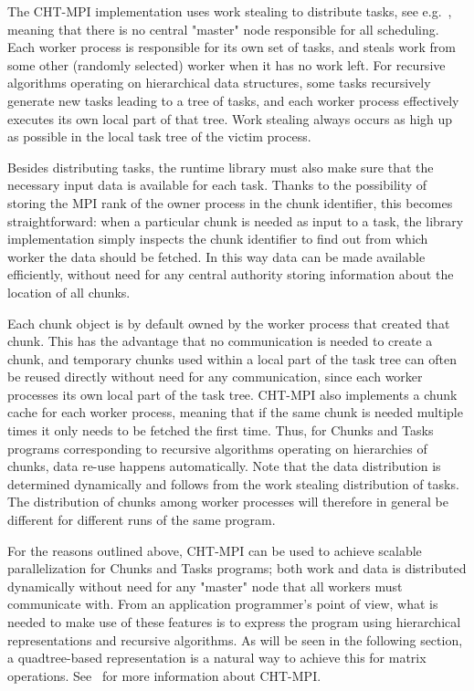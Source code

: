 \documentclass{elsarticle}
\begin{document}
The CHT-MPI implementation uses work stealing to distribute tasks, see
e.g.~\cite{BlumofeAndLeiserson1999}, meaning that there is no central
"master" node responsible for all scheduling. Each worker process is
responsible for its own set of tasks, and steals work from some other
(randomly selected) worker when it has no work left. For recursive
algorithms operating on hierarchical data structures, some tasks
recursively generate new tasks leading to a tree of tasks, and each
worker process effectively executes its own local part of that tree.
Work stealing always occurs as high up as possible in the local task
tree of the victim process.

Besides distributing tasks, the runtime library must also make sure
that the necessary input data is available for each task. Thanks to
the possibility of storing the MPI rank of the owner process in the
chunk identifier, this becomes straightforward: when a particular
chunk is needed as input to a task, the library implementation simply
inspects the chunk identifier to find out from which worker the data
should be fetched. In this way data can be made available efficiently,
without need for any central authority storing information about the
location of all chunks.

Each chunk object is by default owned by the worker process that
created that chunk. This has the advantage that no communication is
needed to create a chunk, and temporary chunks used within a local
part of the task tree can often be reused directly without need for
any communication, since each worker processes its own local part of
the task tree. CHT-MPI also implements a chunk cache for each worker
process, meaning that if the same chunk is needed multiple times it
only needs to be fetched the first time. Thus, for Chunks and Tasks
programs corresponding to recursive algorithms operating on
hierarchies of chunks, data re-use happens automatically. Note that
the data distribution is determined dynamically and follows from the
work stealing distribution of tasks. The distribution of chunks among
worker processes will therefore in general be different for different
runs of the same program.

For the reasons outlined above, CHT-MPI can be used to achieve
scalable parallelization for Chunks and Tasks programs; both work and
data is distributed dynamically without need for any "master" node
that all workers must communicate with. From an application
programmer's point of view, what is needed to make use of these
features is to express the program using hierarchical representations
and recursive algorithms. As will be seen in the following section, a
quadtree-based representation is a natural way to achieve this for
matrix operations. See~\cite{cht-mpi, chunks-and-tasks} for more
information about CHT-MPI.
\end{document}
